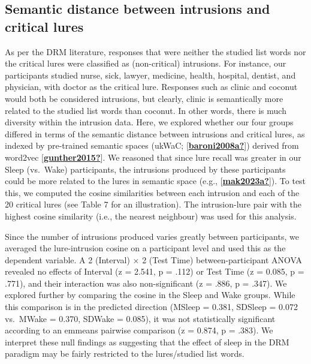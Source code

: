 \documentclass[
]{article}
\begin{document}
\hypertarget{semantic-distance-between-intrusions-and-critical-lures}{%
\subsection{Semantic distance between intrusions and critical lures}\label{semantic-distance-between-intrusions-and-critical-lures}}

As per the DRM literature, responses that were neither the studied list words nor the critical lures were classified as (non-critical) intrusions. For instance, our participants studied nurse, sick, lawyer, medicine, health, hospital, dentist, and physician, with doctor as the critical lure. Responses such as clinic and coconut would both be considered intrusions, but clearly, clinic is semantically more related to the studied list words than coconut. In other words, there is much diversity within the intrusion data. Here, we explored whether our four groups differed in terms of the semantic distance between intrusions and critical lures, as indexed by pre-trained semantic spaces (ukWaC; {[}\protect\hyperlink{ref-baroni2008a}{\textbf{baroni2008a?}}{]}) derived from word2vec {[}\protect\hyperlink{ref-gunther2015}{\textbf{gunther2015?}}{]}. We reasoned that since lure recall was greater in our Sleep (vs.~Wake) participants, the intrusions produced by these participants could be more related to the lures in semantic space (e.g., {[}\protect\hyperlink{ref-mak2023a}{\textbf{mak2023a?}}{]}). To test this, we computed the cosine similarities between each intrusion and each of the 20 critical lures (see Table 7 for an illustration). The intrusion-lure pair with the highest cosine similarity (i.e., the nearest neighbour) was used for this analysis.

Since the number of intrusions produced varies greatly between participants, we averaged the lure-intrusion cosine on a participant level and used this as the dependent variable. A 2 (Interval) \(\times\) 2 (Test Time) between-participant ANOVA revealed no effects of Interval (z = 2.541, p = .112) or Test Time (z = 0.085, p = .771), and their interaction was also non-significant (z = .886, p = .347). We explored further by comparing the cosine in the Sleep and Wake groups. While this comparison is in the predicted direction (MSleep = 0.381, SDSleep = 0.072 vs.~MWake = 0.370, SDWake = 0.085), it was not statistically significant according to an emmeans pairwise comparison (z = 0.874, p = .383). We interpret these null findings as suggesting that the effect of sleep in the DRM paradigm may be fairly restricted to the lures/studied list words.
\end{document}
